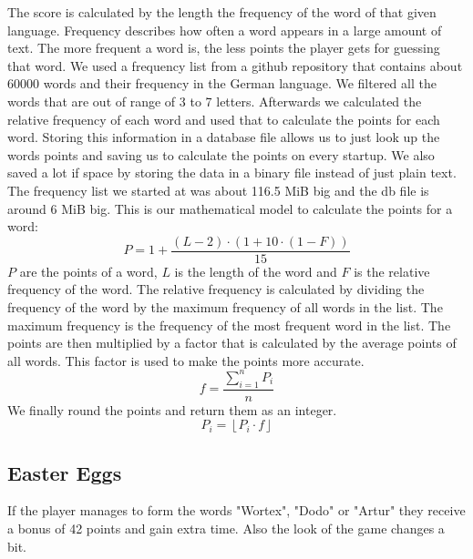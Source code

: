 \documentclass{article}[12pt]
\begin{document}
    The score is calculated by the length the frequency of the word of that
    given language. Frequency describes how often a word appears in a large
    amount of text. The more frequent a word is, the less points the player
    gets for guessing that word. We used a frequency list from a github
    repository that contains about 60000 words and their frequency in the
    German language. We filtered all the words that are out of range of 3 to 7
    letters. Afterwards we calculated the relative frequency of each word and
    used that to calculate the points for each word. Storing this information
    in a database file allows us to just look up the words points and saving us
    to calculate the points on every startup. We also saved a lot if space by
    storing the data in a binary file instead of just plain text. The frequency
    list we started at was about 116.5 MiB big and the db file is around 6 MiB
    big. This is our mathematical model to calculate the points for a word:
    \begin{equation}
       P = 1 + \frac{(L - 2) \cdot (1 + 10 \cdot (1 - F))}{15} 
    \end{equation}
    \noindent
    $P$ are the points of a word, $L$ is the length of the word and $F$
    is the relative frequency of the word. The relative frequency is calculated
    by dividing the frequency of the word by the maximum frequency of all words
    in the list. The maximum frequency is the frequency of the most frequent
    word in the list. The points are then multiplied by a factor that is
    calculated by the average points of all words. This factor is used to make
    the points more accurate.  
    \begin{equation}
        f = \frac{\sum_{i=1}^{n} P_i}{n}
    \end{equation}
    We finally round the points and return them as an integer.
    \begin{equation}
        P_i = \left\lfloor P_i \cdot f \right\rfloor
    \end{equation}

    \subsection*{Easter Eggs}

    If the player manages to form the words "Wortex", "Dodo" or "Artur" they
    receive a bonus of 42 points and gain extra time. Also the look of the game
    changes a bit.
\end{document}
